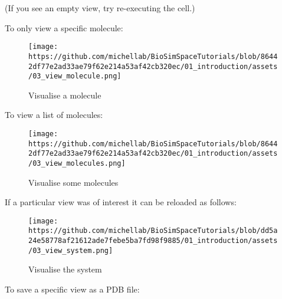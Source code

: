 (If you see an empty view, try re-executing the cell.)

To only view a specific molecule:

\begin{Shaded}
\begin{Highlighting}[]
\NormalTok{)}
\end{Highlighting}
\end{Shaded}

\begin{figure}
\centering
\texttt{[image: https://github.com/michellab/BioSimSpaceTutorials/blob/86442df77e2ad33ae79f62e214a53af42cb320ec/01\_introduction/assets/03\_view\_molecule.png]}
\caption{Visualise a molecule}
\end{figure}

To view a list of molecules:

\begin{Shaded}
\begin{Highlighting}[]
\NormalTok{view.molecules([}\NormalTok{, }\NormalTok{, }\NormalTok{])}
\end{Highlighting}
\end{Shaded}

\begin{figure}
\centering
\texttt{[image: https://github.com/michellab/BioSimSpaceTutorials/blob/86442df77e2ad33ae79f62e214a53af42cb320ec/01\_introduction/assets/03\_view\_molecules.png]}
\caption{Visualise some molecules}
\end{figure}

If a particular view was of interest it can be reloaded as follows:

\begin{Shaded}
\begin{Highlighting}[]
\NormalTok{(}\NormalTok{)}
\end{Highlighting}
\end{Shaded}

\begin{figure}
\centering
\texttt{[image: https://github.com/michellab/BioSimSpaceTutorials/blob/dd5a24e58778af21612ade7febe5ba7fd98f9885/01\_introduction/assets/03\_view\_system.png]}
\caption{Visualise the system}
\end{figure}

To save a specific view as a PDB file:

\begin{Shaded}
\begin{Highlighting}[]
\OperatorTok{=}\NormalTok{)}
\end{Highlighting}
\end{Shaded}

